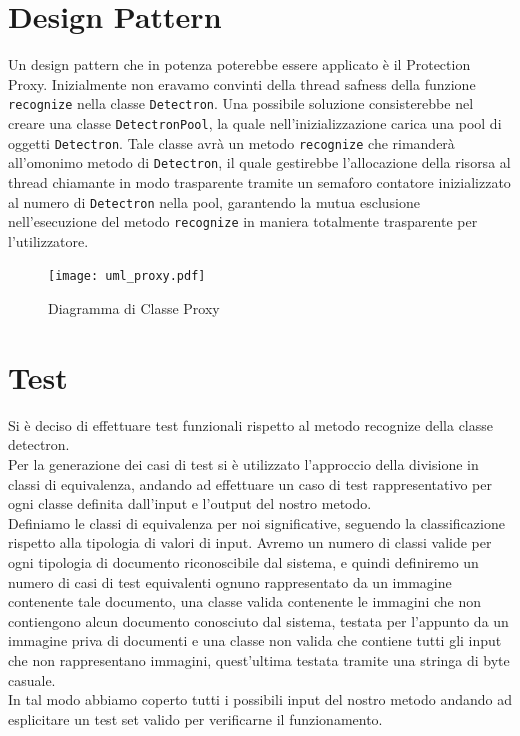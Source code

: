 \documentclass[12pt,a4paper]{article}
\begin{document}
\section{Design Pattern}

Un design pattern che in potenza poterebbe essere applicato è il
Protection Proxy. Inizialmente non eravamo convinti della thread safness
della funzione \texttt{recognize} nella classe \texttt{Detectron}. Una
possibile soluzione consisterebbe nel creare una classe
\texttt{DetectronPool}, la quale nell'inizializzazione carica una pool
di oggetti \texttt{Detectron}. Tale classe avrà un metodo
\texttt{recognize} che rimanderà all'omonimo metodo di
\texttt{Detectron}, il quale gestirebbe l'allocazione della risorsa al
thread chiamante in modo trasparente tramite un semaforo contatore
inizializzato al numero di \texttt{Detectron} nella pool, garantendo la
mutua esclusione nell'esecuzione del metodo \texttt{recognize} in
maniera totalmente trasparente per l'utilizzatore.

\begin{figure}[H]
    \caption{Diagramma di Classe Proxy}
    \centering
    \texttt{[image: uml\_proxy.pdf]}
\end{figure}

\section{Test}

Si è deciso di effettuare test funzionali rispetto al metodo recognize
della classe detectron.\\
Per la generazione dei casi di test si è utilizzato l'approccio della
divisione in classi di equivalenza, andando ad effettuare un caso di
test rappresentativo per ogni classe definita dall'input e l'output del nostro
metodo.\\
Definiamo le classi di equivalenza per noi significative, seguendo la classificazione rispetto
alla tipologia di valori di input.
Avremo un numero di classi valide per ogni tipologia di documento
riconoscibile dal sistema, e quindi definiremo un numero di casi di
test equivalenti ognuno rappresentato da un immagine contenente tale
documento, una classe valida contenente le immagini che non contiengono alcun documento conosciuto dal sistema,
testata per l'appunto da un immagine priva di documenti
e una classe non valida che contiene tutti gli input che non rappresentano
immagini, quest'ultima testata tramite una stringa di byte casuale.\\
In tal modo abbiamo coperto tutti i possibili input del nostro metodo
andando ad esplicitare un test set valido per verificarne il
funzionamento.\\
\end{document}
